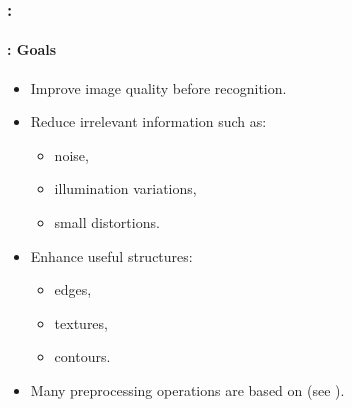 \documentclass[xcolor=table]{beamer}
\begin{document}
\begin{frame}
	\frametitle{\insertshortsubtitle: \insertsection}
	\framesubtitle{\insertsubsection: Goals}
	
	\begin{itemize}
		\item Improve image quality before recognition.
		
		\item Reduce irrelevant information such as:
		\begin{itemize}
			\item noise,
			\item illumination variations,
			\item small distortions.
		\end{itemize}
		
		\item Enhance useful structures:
		\begin{itemize}
			\item edges,
			\item textures,
			\item contours.
		\end{itemize}
		
		\item Many preprocessing operations are based on  (see \cite{2010-alginahi}).
	\end{itemize}
	
\end{frame}
\end{document}
